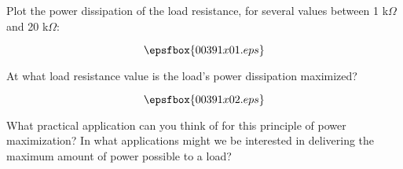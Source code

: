 

Plot the power dissipation of the load resistance, for several values between 1 k$\Omega$ and 20 k$\Omega$:

$$\epsfbox{00391x01.eps}$$

At what load resistance value is the load's power dissipation maximized?







$$\epsfbox{00391x02.eps}$$







What practical application can you think of for this principle of power maximization?  In what applications might we be interested in delivering the maximum amount of power possible to a load?





